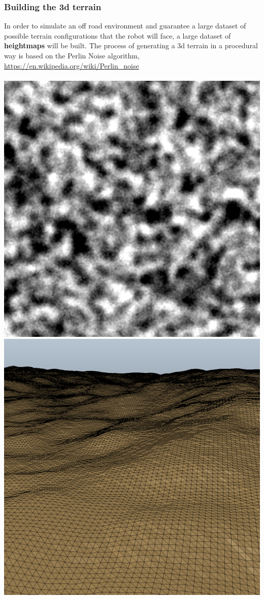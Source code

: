 \documentclass{article}[14pt]
\begin{document}
\subsubsection*{Building the 3d terrain}
In order to simulate an off road environment and guarantee a large dataset of possible terrain configurations that the robot will face,
a large dataset of \textbf{heightmaps} will be built. The process of generating a 3d terrain in a procedural way is based on the Perlin Noise algorithm,
\url{https://en.wikipedia.org/wiki/Perlin_noise}\\\\
\includegraphics*[scale=0.05]{heightmap.png}
\includegraphics*[scale=0.185]{3dterrain.png}
\end{document}
